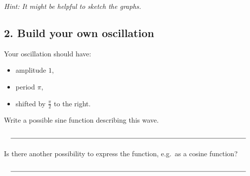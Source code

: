 \documentclass[11pt,a4paper]{article}
\newcommand{\answerline}[1][4cm]{\rule{#1}{0.4pt}}
\begin{document}
\textit{Hint: It might be helpful to sketch the graphs.}

\vspace{1cm}

\subsection*{2. Build your own oscillation}

Your oscillation should have:
\begin{itemize}
\item amplitude $1$,
\item period $\pi$,
\item shifted by $\frac{\pi}{2}$ to the right.
\end{itemize}

Write a possible sine function describing this wave.

\vspace{1cm}
\[
\answerline[12cm]
\]

Is there another possibility to express the function, e.g.\ as a cosine
function?

\vspace{1cm}
\[
\answerline[12cm]
\]
\end{document}
